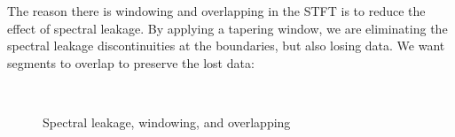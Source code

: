 \documentclass[letter,12pt]{article}
\begin{document}
The reason there is windowing and overlapping in the STFT is to reduce the effect of spectral leakage. By applying a tapering window, we are eliminating the spectral leakage discontinuities at the boundaries, but also losing data. We want segments to overlap to preserve the lost data:

\begin{figure}[ht]
	\vspace*{-0.15cm}
	\centering
	\hspace{0.2em}
	\\
	\hspace{0.2em}
	\caption{Spectral leakage, windowing, and overlapping}
	\label{fig:whyoverlap}%
\end{figure}
\end{document}
